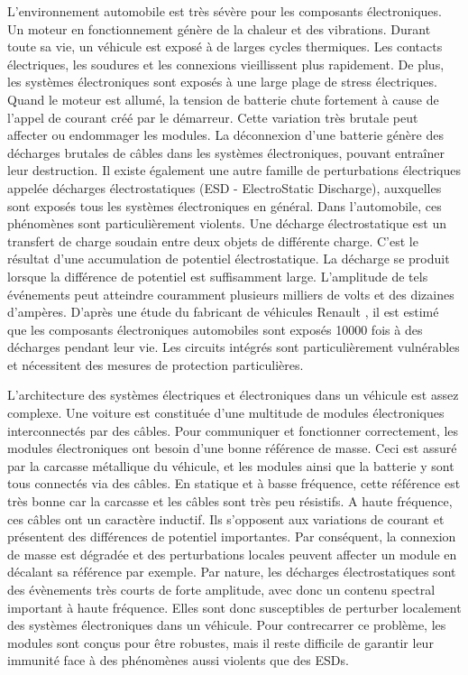 L'environnement automobile est très sévère pour les composants électroniques.
Un moteur en fonctionnement génère de la chaleur et des vibrations.
Durant toute sa vie, un véhicule est exposé à de larges cycles thermiques.
Les contacts électriques, les soudures et les connexions vieillissent plus rapidement.
De plus, les systèmes électroniques sont exposés à une large plage de stress électriques.
Quand le moteur est allumé, la tension de batterie chute fortement à cause de l'appel de courant créé par le démarreur.
Cette variation très brutale peut affecter ou endommager les modules.
La déconnexion d'une batterie génère des décharges brutales de câbles dans les systèmes électroniques, pouvant entraîner leur destruction.
Il existe également une autre famille de perturbations électriques appelée décharges électrostatiques (ESD - ElectroStatic Discharge), auxquelles sont exposés tous les systèmes électroniques en général.
Dans l'automobile, ces phénomènes sont particulièrement violents.
Une décharge électrostatique est un transfert de charge soudain entre deux objets de différente charge.
C'est le résultat d'une accumulation de potentiel électrostatique.
La décharge se produit lorsque la différence de potentiel est suffisamment large.
L'amplitude de tels événements peut atteindre couramment plusieurs milliers de volts et des dizaines d'ampères.
D'après une étude du fabricant de véhicules Renault \cite{Renault-esd}, il est estimé que les composants électroniques automobiles sont exposés 10000 fois à des décharges pendant leur vie.
Les circuits intégrés sont particulièrement vulnérables \cite{impactESDsemiconductors} et nécessitent des mesures de protection particulières.

L'architecture des systèmes électriques et électroniques dans un véhicule est assez complexe.
Une voiture est constituée d'une multitude de modules électroniques interconnectés par des câbles.
Pour communiquer et fonctionner correctement, les modules électroniques ont besoin d'une bonne référence de masse.
Ceci est assuré par la carcasse métallique du véhicule, et les modules ainsi que la batterie y sont tous connectés via des câbles.
En statique et à basse fréquence, cette référence est très bonne car la carcasse et les câbles sont très peu résistifs.
A haute fréquence, ces câbles ont un caractère inductif.
Ils s'opposent aux variations de courant et présentent des différences de potentiel importantes.
Par conséquent, la connexion de masse est dégradée et des perturbations locales peuvent affecter un module en décalant sa référence par exemple.
Par nature, les décharges électrostatiques sont des évènements très courts de forte amplitude, avec donc un contenu spectral important à haute fréquence.
Elles sont donc susceptibles de perturber localement des systèmes électroniques dans un véhicule.
Pour contrecarrer ce problème, les modules sont conçus pour être robustes, mais il reste difficile de garantir leur immunité face à des phénomènes aussi violents que des ESDs.

